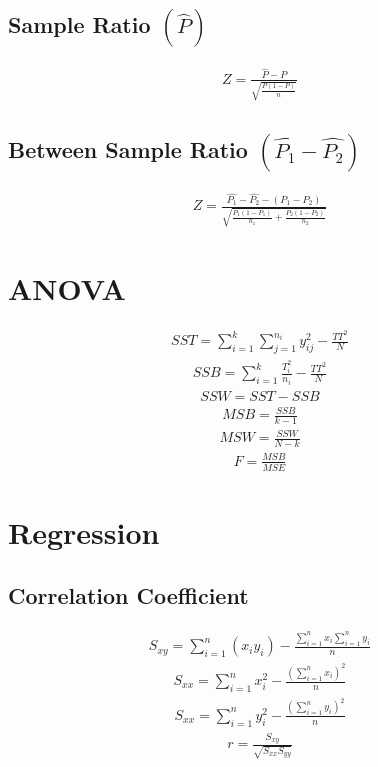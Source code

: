 \documentclass[twocolumn]{article}
\begin{document}
\subsection{Sample Ratio $(\hat{P})$}
\begin{align*}
    Z = \frac{\hat{P} - P}{\sqrt{\frac{P(1-P)}{n}}}
\end{align*}
\subsection{Between Sample Ratio $(\hat{P_{1}} - \hat{P_{2}})$}
\begin{align*}
    Z = \frac{\hat{P_{1}} - \hat{P_{2}} - (P_{1} - P_{2})}{\sqrt{\frac{P_{1}(1-P_{1})}{n_{1}} + \frac{P_{2}(1-P_{2})}{n_{2}}}}
\end{align*}

\vfill\break

\section{ANOVA}
\begin{align*}
    SST = \sum_{i=1}^{k}\sum_{j=1}^{n_{i}}y_{ij}^{2} - \frac{TT^2}{N}
\end{align*}
\begin{align*}
    SSB = \sum_{i=1}^{k}\frac{T_{i}^{2}}{n_{i}} - \frac{TT^2}{N}
\end{align*}
\begin{align*}
    SSW = SST - SSB
\end{align*}
\begin{align*}
    MSB = \frac{SSB}{k-1}
\end{align*}
\begin{align*}
    MSW = \frac{SSW}{N-k}
\end{align*}
\begin{align*}
    F = \frac{MSB}{MSE}
\end{align*}
\section{Regression}
\subsection{Correlation Coefficient}
\begin{align*}
    S_{xy} = \sum_{i=1}^{n}(x_{i}y_{i}) - \frac{\sum_{i=1}^{n}x_{i}\sum_{i=1}^{n}y_{i}}{n}
\end{align*}
\begin{align*}
    S_{xx} = \sum_{i=1}^{n}x_{i}^{2} - \frac{(\sum_{i=1}^{n}x_{i})^{2}}{n}
\end{align*}
\begin{align*}
    S_{xx} = \sum_{i=1}^{n}y_{i}^{2} - \frac{(\sum_{i=1}^{n}y_{i})^{2}}{n}
\end{align*}
\begin{align*}
    r = \frac{S_{xy}}{\sqrt{S_{xx}S_{yy}}}
\end{align*}
\end{document}
